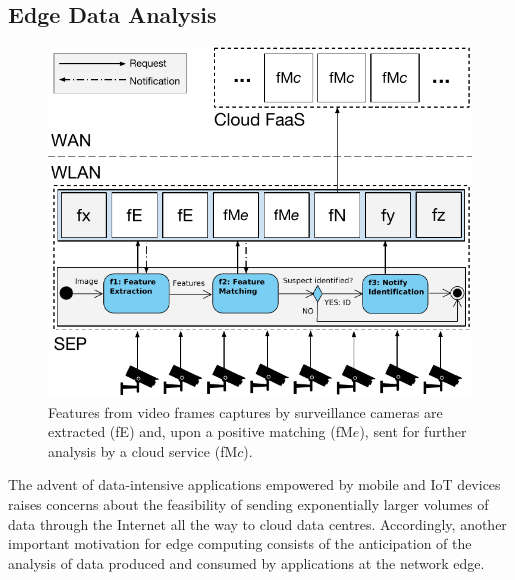 \subsection{Edge Data Analysis}

\begin{figure}[tbp]
	\centering
	\includegraphics[width=\linewidth]{Figs/Edge_Data_Analytics_Video_Surveillance.pdf}
	\caption{Features from video frames captures by surveillance cameras are extracted (fE) and, upon a positive matching (fM$e$), sent for further analysis by a cloud service (fM$c$).}
	\label{fig:Edge_Data_Analytics_Video_Surveillance}
\end{figure}

The advent of data-intensive applications empowered by mobile and IoT devices raises concerns about the feasibility of sending exponentially larger volumes of data through the Internet all the way to cloud data centres. Accordingly, another important motivation for edge computing consists of the anticipation of the analysis of data produced and consumed by applications at the network edge. 


